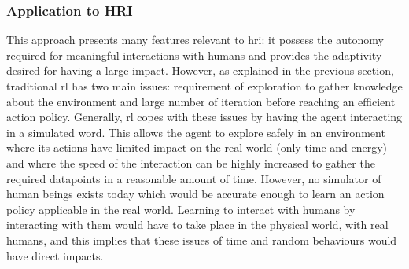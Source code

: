 	
	\subsubsection{Application to HRI}
	
	This approach presents many features relevant to \gls{hri}: it possess the autonomy required for meaningful interactions with humans and provides the adaptivity desired for having a large impact. However, as explained in the previous section, traditional \gls{rl} has two main issues: requirement of exploration to gather knowledge about the environment and large number of iteration before reaching an efficient action policy. Generally, \gls{rl} copes with these issues by having the agent interacting in a simulated word. This allows the agent to explore safely in an environment where its actions have limited impact on the real world (only time and energy) and where the speed of the interaction can be highly increased to gather the required datapoints in a reasonable amount of time. However, no simulator of human beings exists today which would be accurate enough to learn an action policy applicable in the real world. Learning to interact with humans by interacting with them would have to take place in the physical world, with real humans, and this implies that these issues of time and random behaviours would have direct impacts. 
	

